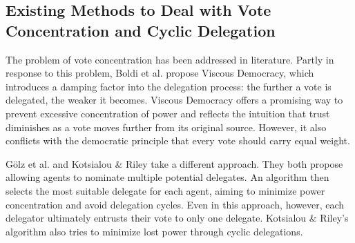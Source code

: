 \subsection{Existing Methods to Deal with Vote Concentration and Cyclic Delegation}

The problem of vote concentration has been addressed in literature. Partly in response to this problem, Boldi et al. propose Viscous Democracy, which introduces a damping factor into the delegation process: the further a vote is delegated, the weaker it becomes. Viscous Democracy offers a promising way to prevent excessive concentration of power and reflects the intuition that trust diminishes as a vote moves further from its original source. However, it also conflicts with the democratic principle that every vote should carry equal weight. \cite{boldiViscousDemocracySocial2011} 

Gölz et al. and Kotsialou \& Riley take a different approach. They both propose allowing agents to nominate multiple potential delegates. An algorithm then selects the most suitable delegate for each agent, aiming to minimize power concentration and avoid delegation cycles. Even in this approach, however, each delegator ultimately entrusts their vote to only one delegate. Kotsialou \& Riley's algorithm  also tries to minimize lost power through cyclic delegations. \cite{kotsialouIncentivisingParticipationLiquid2019, golzFluidMechanicsLiquid2021}

